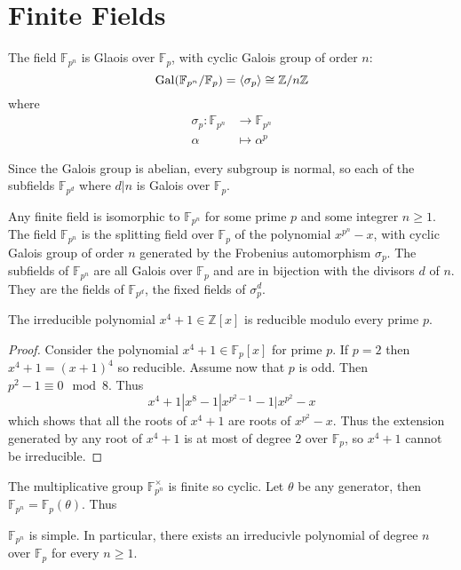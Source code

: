 \documentclass[a4paper]{article}
\begin{document}
\section{Finite Fields}

The field $\mathbb F_{p^n}$ is Glaois over $\mathbb F_p$, with cyclic Galois group of order $n$:
\[
  \gal(\mathbb F_{p^n} / \mathbb F_p) = \langle\sigma_p\rangle \cong \mathbb{Z}/n\mathbb{Z}
\]
where
\begin{align*}
  \sigma_p : \mathbb F_{p^n} & \rightarrow \mathbb F_{p^n} \\
  \alpha & \mapsto \alpha^p
\end{align*}

Since the Galois group is abelian, every subgroup is normal, so each of the subfields $\mathbb F_{p^d}$ where $d|n$ is Galois over $\mathbb F_p$.

\begin{prop}
  Any finite field is isomorphic to $\mathbb F_{p^n}$ for some prime $p$ and some integrer $n \geq 1$. The field $\mathbb F_{p^n}$ is the splitting field over $\mathbb F_p$ of the polynomial $x^{p^n}-x$, with cyclic Galois group of order $n$ generated by the Frobenius automorphism $\sigma_p$. The subfields of $\mathbb F_{p^n}$ are all Galois over $\mathbb F_p$ and are in bijection with the divisors $d$ of $n$. They are the fields of $\mathbb F_{p^d}$, the fixed fields of $\sigma^d_p$.
\end{prop}

\begin{cor}
  The irreducible polynomial $x^4+1 \in \mathbb{Z}[x]$ is reducible modulo every prime $p$.
\end{cor}

\begin{proof}
  Consider the polynomial $x^4+1 \in \mathbb F_p[x]$ for prime $p$. If $p = 2$ then $x^4 + 1 = (x+1)^4$ so reducible. Assume now that $p$ is odd. Then $p^2-1 \equiv 0 \mod 8$. Thus
  \[
    x^4+1 | x^8-1 | x^{p^2-1}-1 | x^{p^2}-x
  \]
  which shows that all the roots of $x^4+1$ are roots of $x^{p^2}-x$. Thus the extension generated by any root of $x^4+1$ is at most of degree $2$ over $\mathbb F_p$, so $x^4+1$ cannot be irreducible.
\end{proof}

The multiplicative group $\mathbb F_{p^n}^\times$ is finite so cyclic. Let $\theta$ be any generator, then $\mathbb F_{p^n} = \mathbb F_p(\theta)$. Thus

\begin{prop}
  $\mathbb F_{p^n}$ is simple. In particular, there exists an irreducivle polynomial of degree $n$ over $\mathbb F_p$ for every $n \geq 1$.
\end{prop}
\end{document}
